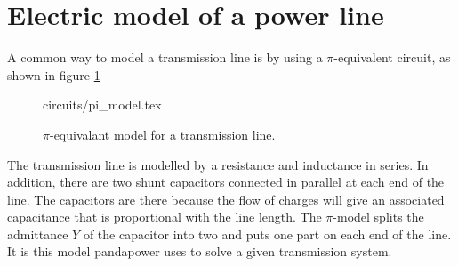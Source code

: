 \documentclass[class=book, crop=false]{standalone}
\begin{document}
\section{Electric model of a power line}
A common way to model a transmission line is by using a $\pi$-equivalent circuit, as shown in figure \ref{fig:theory:PI_model}

\begin{figure}[ht!]
    {circuits/pi_model.tex}
    \caption{$\pi$-equivalant model for a transmission line.}
    \label{fig:theory:PI_model}
\end{figure}



The transmission line is modelled by a resistance and inductance in series. In addition, there are two shunt capacitors connected in parallel at each end of the line. The capacitors are there because the flow of charges will give an associated capacitance that is proportional with the line length. The $\pi$-model splits the admittance $Y$ of the capacitor into two and puts one part on each end of the line. It is this model pandapower uses to solve a given transmission system. 
\end{document}
